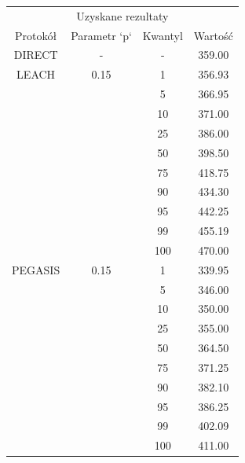 \documentclass[a4paper,12pt,twoside,openany]{report}
\begin{document}
\begin{longtable}{*{4}{c}}
\toprule
\multicolumn{4}{c}{Uzyskane rezultaty} \\
Protokół	& Parametr `p`	& Kwantyl	& Wartość \\
\midrule
\endhead
DIRECT	& - 	& -	& 359.00 \\*
\midrule
LEACH	& 0.15	& 1	& 356.93 \\*
	&	& 5	& 366.95 \\*
	&	& 10	& 371.00 \\*
	&	& 25	& 386.00 \\*
	&	& 50	& 398.50 \\*
	&	& 75	& 418.75 \\*
	&	& 90	& 434.30 \\*
	&	& 95	& 442.25 \\*
	&	& 99	& 455.19 \\*
	&	& 100	& 470.00 \\*
\midrule
PEGASIS	& 0.15	& 1	& 339.95 \\*
	&	& 5	& 346.00 \\*
	&	& 10	& 350.00 \\*
	&	& 25	& 355.00 \\*
	&	& 50	& 364.50 \\*
	&	& 75	& 371.25 \\*
	&	& 90	& 382.10 \\*
	&	& 95	& 386.25 \\*
	&	& 99	& 402.09 \\*
	&	& 100	& 411.00 \\*
\bottomrule
\end{longtable}
\end{document}
